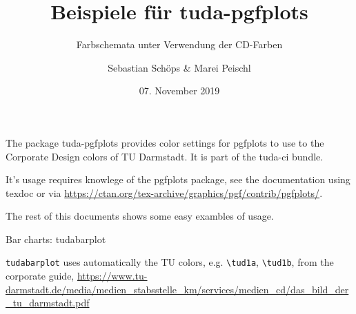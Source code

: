 \documentclass[
	ngerman,%
	aspectratio=169,%
	color={accentcolor=2d},
	logo=false,%
	colorframetitle=true,%
	]{tudabeamer}
\begin{document}
\title{Beispiele für tuda-pgfplots}
\subtitle{Farbschemata unter Verwendung der CD-Farben}
\author{Sebastian Schöps \& Marei Peischl}




\date{07. November 2019}

\maketitle

\begin{frame}
	
The package tuda-pgfplots provides color settings for pgfplots to use to the Corporate Design colors of TU Darmstadt. It is part of the tuda-ci bundle.

It's usage requires knowlege of the pgfplots package, see the documentation using texdoc or via \url{https://ctan.org/tex-archive/graphics/pgf/contrib/pgfplots/}.

The rest of this documents shows some easy exambles of usage.
	
\end{frame}

\begin{frame}{Bar charts: tudabarplot}
\begin{figure}
\end{figure}
\tiny \texttt{tudabarplot} uses automatically the TU colors, e.g. \texttt{{\textbackslash}tud1a}, \texttt{{\textbackslash}tud1b}, from the corporate guide, \url{https://www.tu-darmstadt.de/media/medien_stabsstelle_km/services/medien_cd/das_bild_der_tu_darmstadt.pdf}
\end{frame}
\end{document}
